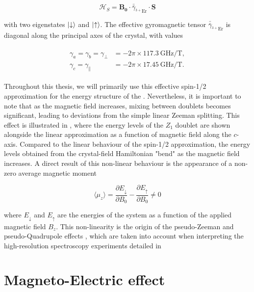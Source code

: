 \begin{equation}
    \label{eq:er_spin_hamiltonian}
    \mathcal{H}_S = \mathbf{B_0}\cdot \bar{\bar{\gamma}}_{^{3+}\text{Er}}\cdot\mathbf{S}
\end{equation}

with two eigenstates $\ket{\downarrow}$ and $\ket{\uparrow}$. The effective gyromagnetic tensor $\bar{\bar{\gamma}}_{^{3+}\text{Er}}$ is diagonal along the principal axes of the crystal, with values 

\begin{align}
\begin{split}
    \gamma_a = \gamma_b = \gamma_\perp &= -2\pi \times 117.3~\text{GHz/T}, \\
    \gamma_c = \gamma_\parallel &= -2\pi \times 17.45~\text{GHz/T}.
\end{split}
\end{align}

Throughout this thesis, we will primarily use this effective spin-1/2 approximation for the energy structure of the \Er. Nevertheless, it is important to note that as the magnetic field increases, mixing between doublets becomes significant, leading to deviations from the simple linear Zeeman splitting. This effect is illustrated in , where the energy levels of the $Z_1$ doublet are shown alongside the linear approximation as a function of magnetic field along the $c$-axis. Compared to the linear behaviour of the spin-1/2 approximation, the energy levels obtained from the crystal-field Hamiltonian "bend" as the magnetic field increases. A direct result of this non-linear behaviour is the appearance of a non-zero average magnetic moment

\begin{equation}
    \langle \mu_z \rangle = \frac{\partial E_\downarrow}{\partial B_0} - \frac{\partial E_\uparrow}{\partial B_0} \neq 0
\end{equation}

where $E_\downarrow$ and $E_\uparrow$ are the energies of the system as a function of the applied magnetic field $B_z$. This non-linearity is the origin of the pseudo-Zeeman  and pseudo-Quadrupole effects , which are taken into account when interpreting the high-resolution spectroscopy experiments detailed in 

\section{Magneto-Electric effect}
\label{sec:magneto-optic}

